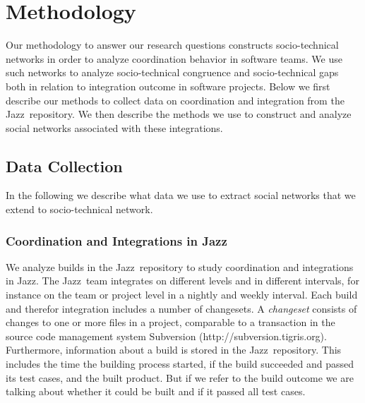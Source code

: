 \documentclass{sig-alternate}
\begin{document}



\section{Methodology}

Our methodology to answer our research questions constructs socio-technical
networks in order to analyze coordination behavior in software teams. We use
such networks to analyze socio-technical congruence and socio-technical gaps
both in relation to integration outcome in software projects.
%
Below we first describe our methods to collect data on coordination and
integration from the Jazz\texttrademark\ repository. We then describe
the methods we use to construct and analyze social networks associated with these integrations.

\subsection{Data Collection}
In the following we describe what data we use to extract social networks that we extend to socio-technical network.

\subsubsection{Coordination and Integrations in Jazz}
We analyze builds in the Jazz\texttrademark\ repository to study
coordination and integrations in Jazz. 
The Jazz\texttrademark\ team integrates on different levels and in different intervals, for instance on the team or project level in a nightly and weekly interval.
Each build and therefor integration includes a number of
changesets. A \emph{changeset} consists of changes to one or more files in a
project, comparable to a transaction in the source code management system
Subversion (http://subversion.tigris.org). Furthermore, information about a  build is
stored in the Jazz\texttrademark\ repository. This includes the time the building
process started, if the build succeeded and passed its test cases, and the built
product. But if we refer to the build outcome we are talking about whether it
could be built and if it passed all test cases.
\end{document}
